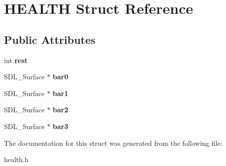 \hypertarget{structHEALTH}{}\section{H\+E\+A\+L\+TH Struct Reference}
\label{structHEALTH}
\subsection*{Public Attributes}
\begin{DoxyCompactItemize}
\item 
int {\bfseries rest}\hypertarget{structHEALTH_a4463dd99d91c8e426bafce735839be4b}{}\label{structHEALTH_a4463dd99d91c8e426bafce735839be4b}

\item 
S\+D\+L\+\_\+\+Surface $\ast$ {\bfseries bar0}\hypertarget{structHEALTH_a05f68f1c0e8f32f873ef55a862b8a868}{}\label{structHEALTH_a05f68f1c0e8f32f873ef55a862b8a868}

\item 
S\+D\+L\+\_\+\+Surface $\ast$ {\bfseries bar1}\hypertarget{structHEALTH_a904bdf09415a051e6965e4ae399f7258}{}\label{structHEALTH_a904bdf09415a051e6965e4ae399f7258}

\item 
S\+D\+L\+\_\+\+Surface $\ast$ {\bfseries bar2}\hypertarget{structHEALTH_a4b5312b241ac090dc39c227b2a4ac4c6}{}\label{structHEALTH_a4b5312b241ac090dc39c227b2a4ac4c6}

\item 
S\+D\+L\+\_\+\+Surface $\ast$ {\bfseries bar3}\hypertarget{structHEALTH_acfc5d7d9390e034e12686a42bb9e1038}{}\label{structHEALTH_acfc5d7d9390e034e12686a42bb9e1038}

\end{DoxyCompactItemize}


The documentation for this struct was generated from the following file\+:\begin{DoxyCompactItemize}
\item 
health.\+h\end{DoxyCompactItemize}
